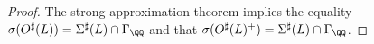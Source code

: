 \begin{proof}
The strong approximation theorem implies the equality
$\sigma(O^\sharp(L)) = \Sigma^\sharp(L) \cap \Gamma_\QQ$ and that
$\sigma(O^\sharp(L)^+) = \Sigma^\sharp(L) \cap \Gamma_\QQ$.
%
%
%
%
\end{proof}



